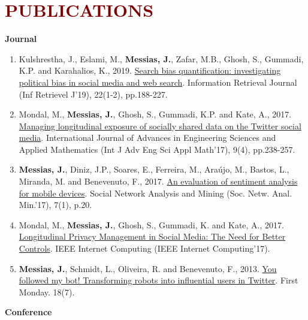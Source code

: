
\section*{\textcolor{maroon}{\normalsize PUBLICATIONS}} 

\textbf{Journal}

\begin{enumerate}

\item Kulshrestha, J., Eslami, M., \textbf{Messias, J.}, Zafar, M.B., Ghosh, S., Gummadi, K.P. and Karahalios, K., 2019. \href{https://t.co/RaTVDuUiMG}{Search bias quantification: investigating political bias in social media and web search}. Information Retrieval Journal (Inf Retrievel J'19), 22(1-2), pp.188-227.
\item Mondal, M., \textbf{Messias, J.}, Ghosh, S., Gummadi, K.P. and Kate, A., 2017. \href{http://rdcu.be/ARJP}{Managing longitudinal exposure of socially shared data on the Twitter social media}. International Journal of Advances in Engineering Sciences and Applied Mathematics (Int J Adv Eng Sci Appl Math'17), 9(4), pp.238-257.
\item \textbf{Messias, J.}, Diniz, J.P., Soares, E., Ferreira, M., Araújo, M., Bastos, L., Miranda, M. and Benevenuto, F., 2017. \href{http://rdcu.be/rZtC}{An evaluation of sentiment analysis for mobile devices}. Social Network Analysis and Mining (Soc. Netw. Anal. Min.'17), 7(1), p.20.
\item Mondal, M., \textbf{Messias, J.}, Ghosh, S., Gummadi, K. and Kate, A., 2017. \href{https://people.mpi-sws.org/~johnme/pdf/mondal_ic17.pdf}{Longitudinal Privacy Management in Social Media: The Need for Better Controls}. IEEE Internet Computing (IEEE Internet Computing'17).
\item \textbf{Messias, J.}, Schmidt, L., Oliveira, R. and Benevenuto, F., 2013. \href{http://firstmonday.org/ojs/index.php/fm/article/view/4217/3700}{You followed my bot! Transforming robots into influential users in Twitter}. First Monday. 18(7).

\end{enumerate}

\textbf{Conference}

